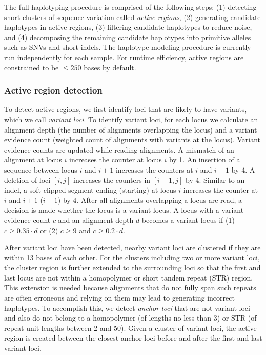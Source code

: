 \documentclass{article}
\begin{document}
The full haplotyping procedure is comprised of the following steps: (1) detecting short clusters of sequence variation called {\em active regions}, (2) generating candidate haplotypes in active regions, (3) filtering candidate haplotypes to reduce noise, and (4) decomposing the remaining candidate haplotypes into primitive alleles such as SNVs and short indels. The haplotype modeling procedure is currently run independently for each sample. For runtime efficiency, active regions are constrained to be $\leq 250$ bases by default.


\subsubsection{Active region detection}
To detect active regions, we first identify loci that are likely to have variants, which we call {\em variant loci}. To identify variant loci, for each locus we calculate an alignment depth (the number of alignments overlapping the locus) and a variant evidence count (weighted count of alignments with variants at the locus). Variant evidence counts are updated while reading alignments. A mismatch of an alignment at locus $i$ increases the counter at locus $i$ by 1. An insertion of a sequence between locus $i$ and $i+1$ increases the counters at $i$ and $i+1$ by 4. A deletion of loci $[i,j]$ increases the counters in $[i-1,j]$ by 4. Similar to an indel, a soft-clipped segment ending (starting) at locus $i$ increases the counter at $i$ and $i+1$ ($i-1$) by 4. After all alignments overlapping a locus are read, a decision is made whether the locus is a variant locus. A locus with a variant evidence count $c$ and an alignment depth $d$ becomes a variant locus if (1) $c \geq 0.35 \cdot d$ or (2) $c \geq 9$ and $c \geq 0.2 \cdot d$.

After variant loci have been detected, nearby variant loci are clustered if they are within 13 bases of each other. For the clusters including two or more variant loci, the cluster region is further extended to the surrounding loci so that the first and last locus are not within a homopolymer or short tandem repeat (STR) region. This extension is needed because alignments that do not fully span such repeats are often erroneous and relying on them may lead to generating incorrect haplotypes. To accomplish this, we detect {\em anchor loci} that are not variant loci and also do not belong to a homopolymer (of lengths no less than 3) or STR (of repeat unit lengths between 2 and 50). Given a cluster of variant loci, the active region is created between the closest anchor loci before and after the first and last variant loci.
\end{document}
